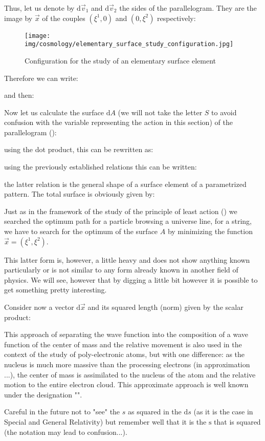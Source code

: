 	Thus, let us denote by $\mathrm{d}\vec{v}_1$ and $\mathrm{d}\vec{v}_2$ the sides of the parallelogram. They are the image by $\vec{x}$ of the couples $(\xi^1,0)$ and $(0,\xi^2)$ respectively:
	\begin{figure}[H]
		\begin{center}
		\texttt{[image: img/cosmology/elementary\_surface\_study\_configuration.jpg]}
		\end{center}	
		\caption{Configuration for the study of an elementary surface element}
	\end{figure}
	Therefore we can write:
	
	and then:
	
	Now let us calculate the surface $\mathrm{d}A$ (we will not take the letter $S$ to avoid confusion with the variable representing the action in this section) of the parallelogram ():
	
	using the dot product, this can be rewritten as:
	
	using the previously established relations this can be written:
	
	the latter relation is the general shape of a surface element of a parametrized pattern. The total surface is obviously given by:
	
	Just as in the framework of the study of the principle of least action () we searched the optimum path for a particle browsing a universe line, for a string, we have to search for the optimum of the surface $A$ by minimizing the function $\vec{x}=\left(\xi^1,\xi^2\right)$.
	
	This latter form is, however, a little heavy and does not show anything known particularly or is not similar to any form already known in another field of physics. We will see, however that by digging a little bit however it is possible to get something pretty interesting.
	
	Consider now a vector $\mathrm{d}\vec{x}$ and its squared length (norm) given by the scalar product:
	
	\begin{tcolorbox}[title=Remark,colframe=black,arc=10pt]
	This approach of separating the wave function into the composition of a wave function of the center of mass and the relative movement is also used in the context of the study of poly-electronic atoms, but with one difference: as the nucleus is much more massive than the processing electrons (in approximation ...), the center of mass is assimilated to the nucleus of the atom and the relative motion to the entire electron cloud. This approximate approach is well known under the designation "".
	\end{tcolorbox}
	Careful in the future not to "see" the $s$ as squared in the $\mathrm{d}s$ (as it is the case in Special and General Relativity) but remember well that it is the $\mathrm{s}$ that is squared (the notation may lead to confusion...).
	
